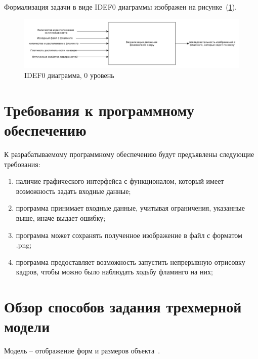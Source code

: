 Формализация задачи в виде IDEF0 диаграммы изображен на рисунке~(\ref{fig:idef0}).

\begin{figure}[h!]
	\centering
	\includegraphics[width=\linewidth]{img/idef0}
	\caption{IDEF0 диаграмма, 0 уровень}
	\label{fig:idef0}
\end{figure}

\section[Требования к программному обеспечению]{Требования к программному\\обеспечению}

К разрабатываемому программному обеспечению будут предъявлены следующие требования:
\begin{enumerate}[label=\arabic*)]
	\item наличие графического интерфейса с функционалом, который имеет возможность задать входные данные;
	\item программа принимает входные данные, учитывая ограничения, указанные выше, иначе выдает ошибку;
	\item программа может сохранять полученное изображение в файл с форматом .png;
	\item программа предоставляет возможность запустить непрерывную отрисовку кадров, чтобы можно было наблюдать ходьбу фламинго на них;
\end{enumerate} 

\section[Обзор способов задания трехмерной модели]{Обзор способов задания трехмерной\\модели}

Модель – отображение форм и размеров объекта~\cite{kurov}.

